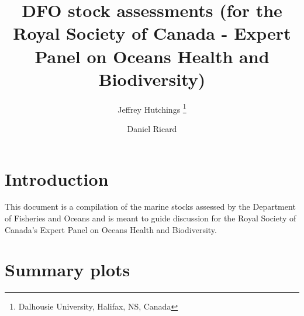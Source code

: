 \documentclass[a4paper,10pt,oneside]{book}
\author{Jeffrey Hutchings  \thanks{Dalhousie University, Halifax, NS, Canada} \and Daniel Ricard }
\title{DFO stock assessments (for the Royal Society of Canada - Expert Panel on Oceans Health and Biodiversity)}
\begin{document}
\maketitle
\tableofcontents

\chapter{Introduction}

This document is a compilation of the marine stocks assessed by the Department of Fisheries and Oceans and is meant to guide discussion for the Royal Society of Canada's Expert Panel on Oceans Health and Biodiversity.

\chapter{Summary plots}



\printindex
\end{document}
